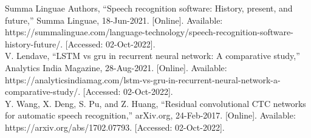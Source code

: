 Summa Linguae Authors, “Speech recognition software: History, present, and future,” Summa Linguae, 18-Jun-2021. [Online]. \newline Available: https://summalinguae.com/language-technology/speech-recognition-software-history-future/. [Accessed: 02-Oct-2022]. \\
\newline
V. Lendave, “LSTM vs gru in recurrent neural network: A comparative study,” Analytics India Magazine, 28-Aug-2021. [Online]. \newline Available: https://analyticsindiamag.com/lstm-vs-gru-in-recurrent-neural-network-a-comparative-study/. [Accessed: 02-Oct-2022]. \\
\newline
Y. Wang, X. Deng, S. Pu, and Z. Huang, “Residual convolutional CTC networks for automatic speech recognition,” arXiv.org, 24-Feb-2017. [Online]. \newline Available: https://arxiv.org/abs/1702.07793. [Accessed: 02-Oct-2022].
